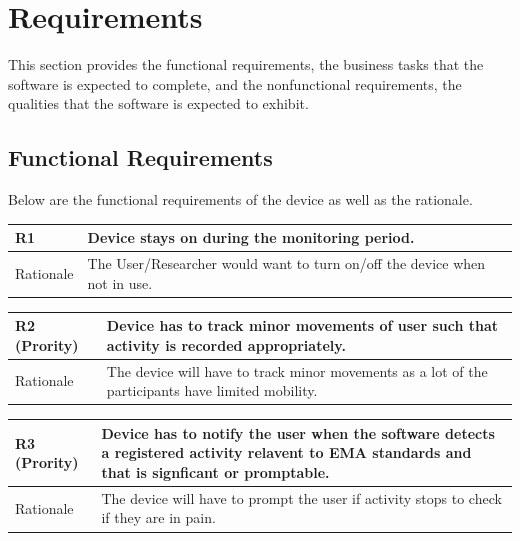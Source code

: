 \documentclass[12pt]{article}
\begin{document}
\section{Requirements}

This section provides the functional requirements, the business tasks that the
software is expected to complete, and the nonfunctional requirements, the
qualities that the software is expected to exhibit.

\subsection{Functional Requirements}
Below are the functional requirements of the device as well as the rationale.


\begin{center}
\begin{tabular}{|l|p{14cm}|}
 \hline
 R1 \label{R1} & Device stays on during the monitoring period. \\ [0.5ex]
 \hline
 Rationale &  The User/Researcher would want to turn on/off the device when not in use.\\ 
 \hline
\end{tabular}
\end{center}
\hspace{0.5cm}
\begin{center}
\begin{tabular}{|l|p{14cm}|}
 \hline
 R2 \label{R2} (Prority) & Device has to track minor movements of user such that activity is recorded appropriately.\\ [0.5ex]
 \hline
 Rationale &  The device will have to track minor movements as a lot of the participants have limited mobility.\\ 
 \hline
\end{tabular}
\end{center}
\hspace{0.5em}
\begin{center}
\begin{tabular}{|l|p{14cm}|}
 \hline
 R3 \label{R3}(Prority) &Device has to notify the user when the software detects a registered activity relavent to EMA standards and that is signficant or promptable.\\ [0.5ex]
 \hline
 Rationale &  The device will have to prompt the user if activity stops to check if they are in pain.\\ 
 \hline
\end{tabular}
\end{center}
\end{document}
